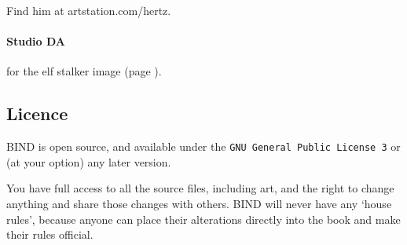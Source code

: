 \begin{multicols}{2}
Find him at artstation.com/hertz.

\paragraph{Studio DA}
for the elf stalker image
(page \pageref{Studio_DA/elf_stalker}).

\subsection*{Licence}

BIND is open source, and available under the {\tt GNU General Public License 3} or (at your option) any later version.

You have full access to all the source files, including art, and the right to change anything and share those changes with others.
BIND will never have any `house rules', because anyone can place their alterations directly into the book and make their rules official.

\end{multicols}
